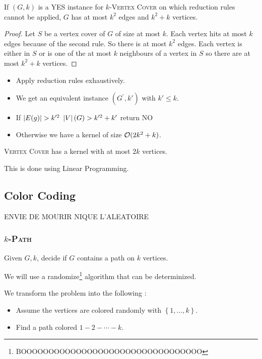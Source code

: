 \documentclass{cours}
\begin{document}
\begin{lemma}
    If $(G, k)$ is a YES instance for $k$-\textsc{Vertex Cover} on which reduction rules cannot be applied, $G$ has at most $k^{2}$ edges and $k^{2} + k$ vertices.
\end{lemma}
\begin{proof}
    Let $S$ be a vertex cover of $G$ of size at most $k$. Each vertex hits at most $k$ edges because of the second rule. So there is at most $k^{2}$ edges. Each vertex is either in $S$ or is one of the at most $k$ neighbours of a vertex in $S$ so there are at most $k^{2} + k$ vertices. 
\end{proof}

\begin{proposition}
    \begin{itemize}
        \item Apply reduction rules exhaustively. 
        \item We get an equivalent instance $(G^{'}, k')$ with $k' \leq k$.
        \item If $\left|E(g)\right| > k'^{2}$ $\left|V\right|(G) > k'^{2} + k'$ return NO
        \item Otherwise we have a kernel of size $\mathcal{O}(2k^{2} + k)$.
    \end{itemize}
\end{proposition}

\begin{theorem}
    \textsc{Vertex Cover} has a kernel with at most $2k$ vertices. 
\end{theorem}
This is done using Linear Programming. 

\subsection{Color Coding}
ENVIE DE MOURIR NIQUE L'ALEATOIRE

\subsubsection{$k$-\textsc{Path}}
\begin{definition}
    Given $G, k$, decide if $G$ contains a path on $k$ vertices. 
\end{definition}

We will use a randomize\footnote{BOOOOOOOOOOOOOOOOOOOOOOOOOOOOOOOOO} algorithm that can be determinized.

We transform the problem into the following : 
\begin{itemize}
    \item Assume the vertices are colored randomly with $\left\{1, \ldots, k\right\}$. 
    \item Find a path colored $1 - 2 - \cdots - k$. 
\end{itemize}
\end{document}
